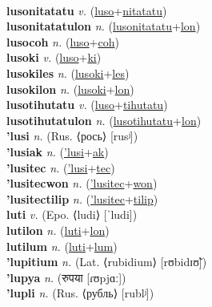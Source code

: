  \label{lusolyan} \\
\textbf{lusonitatatu} \textit{v.} (\hyperref[luso]{luso}+\hyperref[nitatatu]{nitatatu})
 \label{lusonitatatu} \\
\textbf{lusonitatatulon} \textit{n.} (\hyperref[lusonitatatu]{lusonitatatu}+\hyperref[lon]{lon})
 \label{lusonitatatulon} \\
\textbf{lusocoh} \textit{n.} (\hyperref[luso]{luso}+\hyperref[coh]{coh})
 \label{lusocoh} \\
\textbf{lusoki} \textit{v.} (\hyperref[luso]{luso}+\hyperref[ki]{ki})
 \label{lusoki} \\
\textbf{lusokiles} \textit{n.} (\hyperref[lusoki]{lusoki}+\hyperref[les]{les})
 \label{lusokiles} \\
\textbf{lusokilon} \textit{n.} (\hyperref[lusoki]{lusoki}+\hyperref[lon]{lon})
 \label{lusokilon} \\
\textbf{lusotihutatu} \textit{v.} (\hyperref[luso]{luso}+\hyperref[tihutatu]{tihutatu})
 \label{lusotihutatu} \\
\textbf{lusotihutatulon} \textit{n.} (\hyperref[lusotihutatu]{lusotihutatu}+\hyperref[lon]{lon})
 \label{lusotihutatulon} \\
\textbf{'lusi} \textit{n.} (Rus. ⟨рось⟩ [rusʲ])
 \label{'lusi} \\
\textbf{'lusiak} \textit{n.} (\hyperref['lusi]{'lusi}+\hyperref[ak]{ak})
 \label{'lusiak} \\
\textbf{'lusitec} \textit{n.} (\hyperref['lusi]{'lusi}+\hyperref[tec]{tec})
 \label{'lusitec} \\
\textbf{'lusitecwon} \textit{n.} (\hyperref['lusitec]{'lusitec}+\hyperref[won]{won})
 \label{'lusitecwon} \\
\textbf{'lusitectilip} \textit{n.} (\hyperref['lusitec]{'lusitec}+\hyperref[tilip]{tilip})
 \label{'lusitectilip} \\
\textbf{luti} \textit{v.} (Epo. ⟨ludi⟩ [ˈludi])
 \label{luti} \\
\textbf{lutilon} \textit{n.} (\hyperref[luti]{luti}+\hyperref[lon]{lon})
 \label{lutilon} \\
\textbf{lutilum} \textit{n.} (\hyperref[luti]{luti}+\hyperref[lum]{lum})
 \label{lutilum} \\
\textbf{'lupitium} \textit{n.} (Lat. ⟨rubidium⟩ [rʊbidɪʊ̃])
 \label{'lupitium} \\
\textbf{'lupya} \textit{n.} ({\devanagari{}रुपया} [ɾʊpjɑː])
 \label{'lupya} \\
\textbf{'lupli} \textit{n.} (Rus. ⟨рубль⟩ [rublʲ])
 \label{'lupli} \\
